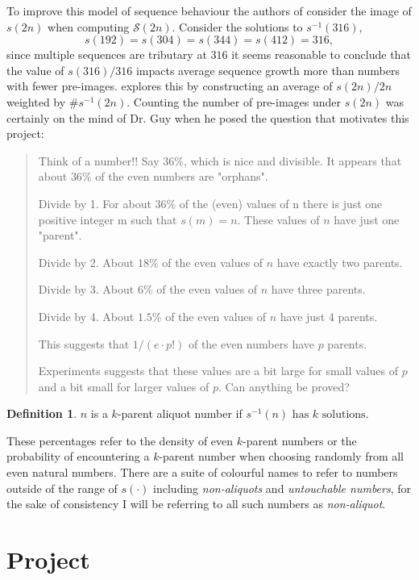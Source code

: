 \documentclass{article}
\theoremstyle{definition}
\newtheorem{definition}{Definition}[section]
\begin{document}
To improve this model of sequence behaviour the authors of \cite{chum_guy_jacobson_mosunov_2018} consider the image of $s(2n)$ when computing $\mathcal{S}(2n)$. Consider the solutions to $s^{-1}(316),$ 
$$s(192) = s(304) = s(344) = s(412) = 316,$$
since multiple sequences are tributary at $316$ it seems reasonable to conclude that the value of $s(316) / 316$ impacts average sequence growth more than numbers with fewer pre-images. \cite{chum_guy_jacobson_mosunov_2018} explores this by constructing an average of $s(2n)/2n$ weighted by $\#s^{-1}(2n)$. Counting the number of pre-images under $s(2n)$ was certainly on the mind of Dr. Guy when he posed the question that motivates this project:
%
\begin{quote}
Think of a number!! Say $36$\%, which is nice and divisible. It appears that about $36$\% of the even numbers are "orphans".

Divide by 1. For about $36$\% of the (even) values of n there is just one positive integer m such that $s(m) = n$. These values of $n$ have just one "parent".

Divide by 2.  About $18$\% of the even values of $n$ have exactly two parents.

Divide by 3. About $6$\% of the even values of $n$ have three parents.

Divide by 4. About $1.5$\% of the even values of $n$ have just 4 parents.

This suggests that $1 / (e \cdot p!)$ of the even numbers have $p$ parents.

Experiments suggests that these values are a bit large for small values of $p$ and a bit small for larger values of $p$. Can anything be proved?
\end{quote}
%
\begin{definition}
$n$ is a $k$-parent aliquot number if $s^{-1}(n) \text{ has } k \text{ solutions}$.
\end{definition}
%
These percentages refer to the density of even $k$-parent numbers or the probability of encountering a $k$-parent number when choosing randomly from all even natural numbers. There are a suite of colourful names to refer to numbers outside of the range of $s(\cdot)$ including \textit{non-aliquots} and \textit{untouchable numbers}, for the sake of consistency I will be referring to all such numbers as \textit{non-aliquot}.
%
\section{Project}
\end{document}
